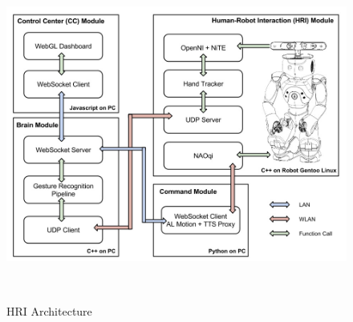 \begin{figure}
	[h] \centering 
	\includegraphics[height=11cm]{figures/content/hri-architecture.jpg} \caption{HRI Architecture} \label{fg:hri:architecture} 
\end{figure}
